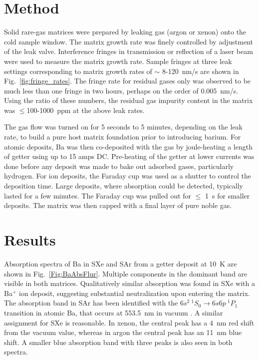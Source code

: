 \documentclass[aps,pra,reprint,superscriptaddress]{revtex4-1}
\begin{document}
\section{Method}
Solid rare-gas matrices were prepared by leaking gas (argon or xenon) onto the cold sample window. 
The matrix growth rate was finely controlled by adjustment of the leak valve.  
Interference fringes in transmission or reflection of a laser beam were used to measure the matrix growth rate. 
Sample fringes at three leak settings corresponding to matrix growth rates of $\sim $ 8-120~nm/s are shown in Fig.~\ref{fig:fringe_rates}.
The fringe rate for residual gases only was observed to be much less than one fringe in two hours, perhaps on the order of 0.005~nm/s.
Using the ratio of these numbers, the residual gas impurity content in the matrix was $\le$100-1000~ppm at the above leak rates.


The gas flow was turned on for 5 seconds to 5 minutes, depending on the leak rate, to build a pure host matrix foundation prior to introducing barium. 
For atomic deposits, Ba was then co-deposited with the gas by joule-heating a length of getter using up to 15 amps DC.  
Pre-heating of the getter at lower currents was done before any deposit was made to bake out adsorbed gases, particularly hydrogen.
For ion deposits, the Faraday cup was used as a shutter to control the deposition time.
Large deposits, where absorption could be detected, typically lasted for a few minutes.
The Faraday cup was pulled out for $\le$ 1~s for smaller deposits.
The matrix was then capped with a final layer of pure noble gas. 

\section{Results}

Absorption spectra of Ba in SXe and SAr from a getter deposit at 10~K are shown in Fig.~\ref{Fig:BaAbsFlur}. 
Multiple components in the dominant band are visible in both matrices.  
Qualitatively similar absorption was found in SXe with a Ba$^+$ ion deposit, suggesting substantial neutralization upon entering the matrix.
The absorption band in SAr has been identified with the  $6s^2 ~{^1}S_0 \rightarrow 6s6p ~{^1}P_1$ transition in atomic Ba, that occurs at 553.5~nm in vacuum \cite{Balling1985}.
A similar assignment for SXe is reasonable.
In xenon, the central peak has a 4~nm red shift from the vacuum value, whereas in argon the central peak has an 11~nm blue shift.  
A smaller blue absorption band with three peaks is also seen in both spectra.  
\end{document}
